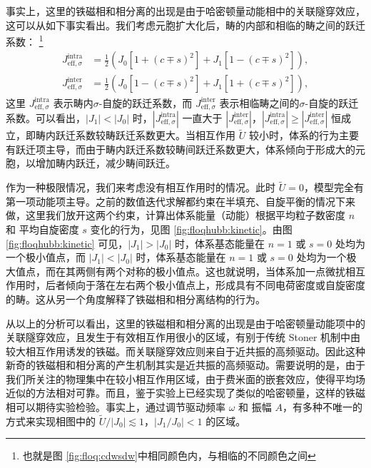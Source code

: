 事实上，这里的铁磁相和相分离的出现是由于哈密顿量动能相中的关联隧穿效应，这可以从如下事实看出。我们考虑元胞扩大化后，畴的内部和相临的畴之间的跃迁系数：
\footnote{也就是图 \ref{fig:floq:cdwsdw}中相同颜色内，与相临的不同颜色之间}
\begin{align}
    J^{\text{intra}}_{\text{eff},\sigma} &= \frac{1}{2} \left(J_0[1+(c\mp s)^2]+J_1[1-(c\mp s)^2]\right), \\
    J^{\text{inter}}_{\text{eff},\sigma} &= \frac{1}{2} \left(J_0[1-(c\mp s)^2]+J_1[1+(c\mp s)^2]\right),
\end{align}
这里 $J^{\text{intra}}_{\text{eff},\sigma}$ 表示畴内$\sigma$-自旋的跃迁系数，而 $J^{\text{inter}}_{\text{eff},\sigma}$ 表示相临畴之间的$\sigma$-自旋的跃迁系数。可以看出，$|J_1|<|J_0|$ 时，$|J^{\text{intra}}_{\text{eff},\sigma}|$ 一直大于 $|J^{\text{inter}}_{\text{eff},\sigma}|$，$|J^{\text{intra}}_{\text{eff},\sigma}|\geq|J^{\text{inter}}_{\text{eff},\sigma}|$ 恒成立，即畴内跃迁系数较畴跃迁系数更大。当相互作用 $\tilde{U}$ 较小时，体系的行为主要有跃迁项主导，而由于畴内跃迁系数较畴间跃迁系数更大，体系倾向于形成大的元胞，以增加畴内跃迁，减少畴间跃迁。


作为一种极限情况，我们来考虑没有相互作用时的情况。此时 $\tilde{U}=0$，模型完全有第一项动能项主导。之前的数值迭代求解都约束在半填充、自旋平衡的情况下来做，这里我们放开这两个约束，计算出体系能量（动能）根据平均粒子数密度 $n$ 和 平均自旋密度 $s$ 变化的行为，见图 \ref{fig:floqhubb:kinetic}。由图 \ref{fig:floqhubb:kinetic} 可见，$|J_1|>|J_0|$ 时，体系基态能量在 $n=1$ 或 $s=0$ 处均为一个极小值点，而 $|J_1|<|J_0|$ 时，体系基态能量在 $n=1$ 或 $s=0$ 处均为一个极大值点，而在其两侧有两个对称的极小值点。这也就说明，当体系加一点微扰相互作用时，后者倾向于落在左右两个极小值点上，形成具有不同电荷密度或自旋密度的畴。这从另一个角度解释了铁磁相和相分离结构的行为。


从以上的分析可以看出，这里的铁磁相和相分离的出现是由于哈密顿量动能项中的关联隧穿效应，且发生于有效相互作用很小的区域，有别于传统 Stoner 机制中由较大相互作用诱发的铁磁。而关联隧穿效应则来自于近共振的高频驱动。因此这种新奇的铁磁相和相分离的产生机制其实是近共振的高频驱动。需要说明的是，由于我们所关注的物理集中在较小相互作用区域，由于费米面的嵌套效应，使得平均场近似的方法相对可靠。而且，鉴于实验上已经实现了类似的哈密顿量\cite{correlated-tunnel-expr-2018-shaking}，这样的铁磁相可以期待实验检验。事实上，通过调节驱动频率 $\omega$ 和 振幅 $A$，有多种不唯一的方式来实现相图中的 $\tilde{U}/|J_0|\lesssim1$，$|J_1/J_0|<1$ 的区域。







